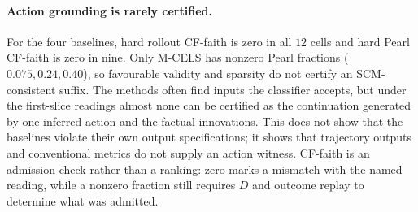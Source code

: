 \documentclass{article}
\begin{document}
\paragraph{Action grounding is rarely certified.}
\label{sec:res-benchmark}

For the four baselines, hard rollout CF-faith is zero in all $12$ cells and hard Pearl CF-faith is zero in nine. Only M-CELS has nonzero Pearl fractions ($0.075,0.24,0.40$), so favourable validity and sparsity do not certify an SCM-consistent suffix. The methods often find inputs the classifier accepts, but under the first-slice readings almost none can be certified as the continuation generated by one inferred action and the factual innovations. This does not show that the baselines violate their own output specifications; it shows that trajectory outputs and conventional metrics do not supply an action witness. CF-faith is an admission check rather than a ranking: zero marks a mismatch with the named reading, while a nonzero fraction still requires $D$ and outcome replay to determine what was admitted.
\end{document}
